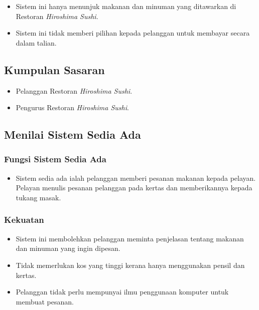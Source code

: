 \documentclass[a4paper, 12pt]{article}
\begin{document}
\begin{itemize}
    \item Sistem ini hanya menunjuk makanan dan minuman yang ditawarkan di Restoran \textit{Hiroshima Sushi}.
    \item Sistem ini tidak memberi pilihan kepada pelanggan untuk membayar secara dalam talian.
\end{itemize}

\subsection{Kumpulan Sasaran}

\begin{itemize}
    \item Pelanggan Restoran \textit{Hiroshima Sushi}.
    \item Pengurus Restoran \textit{Hiroshima Sushi}.
\end{itemize}

\subsection{Menilai Sistem Sedia Ada}

\subsubsection*{Fungsi Sistem Sedia Ada}

\begin{itemize}
    \item Sistem sedia ada ialah pelanggan memberi pesanan makanan kepada pelayan. Pelayan menulis pesanan pelanggan pada kertas dan memberikannya kepada tukang masak.
\end{itemize}

\subsubsection*{Kekuatan}

\begin{itemize}
    \item Sistem ini membolehkan pelanggan meminta penjelasan tentang makanan dan minuman yang ingin dipesan.
    \item Tidak memerlukan kos yang tinggi kerana hanya menggunakan pensil dan kertas.
    \item Pelanggan tidak perlu mempunyai ilmu penggunaan komputer untuk membuat pesanan.
\end{itemize}
\end{document}
